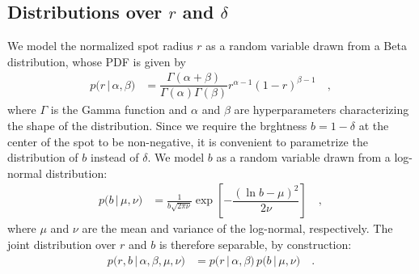 \documentclass[modern]{aastex62}
\begin{document}
\subsection{Distributions over $r$ and $\delta$}
%
We model the normalized spot radius $r$ as a random variable drawn from
a Beta distribution, whose PDF is given by
%
\begin{align}
    p \big(r \, \big| \, \alpha, \beta \big)
     & =
    \dfrac{\Gamma(\alpha + \beta)}{\Gamma(\alpha)\Gamma(\beta)}
    r^{\alpha - 1}
    (1 - r)^{\beta - 1}
    \quad,
\end{align}
%
where $\Gamma$ is the Gamma function and $\alpha$ and $\beta$ are
hyperparameters characterizing the shape of the distribution.
%
Since we require the brghtness $b = 1 - \delta$ at the center of the spot to
be non-negative, it is convenient to parametrize the distribution of $b$
instead of $\delta$. We model $b$ as a random variable drawn from a log-normal
distribution:
%
\begin{align}
    \label{eq:lognormal}
    p \big(b \, \big| \, \mu, \nu \big)
     & =
    \frac{1}{b\sqrt{2\pi\nu}}
    \exp\left[
        -\dfrac{\left(\ln b - \mu\right)^2}{2\nu}
        \right]
    \quad,
\end{align}
%
where $\mu$ and $\nu$ are the mean and variance of the log-normal, respectively.
The joint distribution over $r$ and $b$ is therefore separable,
by construction:
%
\begin{align}
    p \big( r, b \, \big| \, \alpha, \beta, \mu, \nu \big)
     & =
    p \big(r \, \big| \, \alpha, \beta \big)
    \,
    p \big(b \, \big| \, \mu, \nu \big)
    \quad.
\end{align}
%
\end{document}
